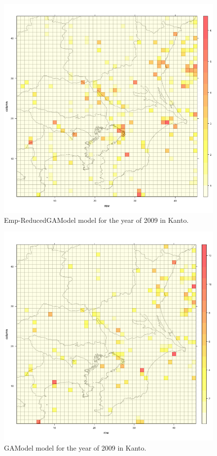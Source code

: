 \begin{figure}[!htb]
\centering
\includegraphics[scale=0.2]{img/NP_HybridKanto_2009.png}
\caption{Emp-ReducedGAModel model for the year of 2009 in Kanto.}
\label{listas-NPHybridKanto_2009.png}
\end{figure}


\begin{figure}[!htb]
\centering
\includegraphics[scale=0.2]{img/modeloKanto_2009.png}
\caption{GAModel model for the year of 2009 in Kanto.}
\label{gamodel_2009.png}
\end{figure}


